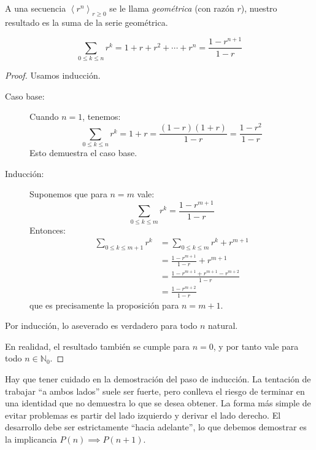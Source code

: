  A una secuencia \(\left\langle r^n \right\rangle_{r \ge 0}\)
  se le llama \emph{geométrica}
  (con razón \(r\)),
  nuestro resultado es la suma de la serie geométrica.
  \begin{theorem}
    \label{theo:suma-geometrica}
    \begin{equation*}
      \sum_{0 \le k \le n} r^k
	= 1 + r + r^2 + \dotsb + r^n
	= \frac{1 - r^{n + 1}}{1 - r}
    \end{equation*}
  \end{theorem}
  \begin{proof}
    Usamos inducción.
    \begin{description}
    \item[Caso base:]
      Cuando \(n = 1\),
      tenemos:
      \begin{equation*}
	\sum_{0 \le k \le n} r^k
	= 1 + r
	= \frac{(1 - r) (1 + r)}{1 - r}
	= \frac{1 - r^2}{1 - r}
      \end{equation*}
      Esto demuestra el caso base.
    \item[Inducción:]
      Suponemos que para \(n = m\) vale:
      \begin{equation*}
	\sum_{0 \le k \le m} r^k
	  = \frac{1 - r^{m + 1}}{1 - r}
      \end{equation*}
      Entonces:
      \begin{align*}
	\sum_{0 \le k \le m + 1} r^k
	  &= \sum_{0 \le k \le m} r^k + r^{m + 1} \\
	  &= \frac{1 - r^{m + 1}}{1 - r} + r^{m + 1} \\
	  &= \frac{1 - r^{m + 1} + r^{m + 1} - r^{m + 2}}{1 - r} \\
	  &= \frac{1 - r^{m + 2}}{1 - r}
      \end{align*}
      que es precisamente la proposición para \(n = m + 1\).
    \end{description}
    Por inducción,
    lo aseverado es verdadero para todo \(n\) natural.

    En realidad,
    el resultado también se cumple para \(n = 0\),
    y por tanto vale para todo \(n \in \mathbb{N}_0\).
  \end{proof}

  Hay que tener cuidado en la demostración del paso de inducción.
  La tentación de trabajar ``a ambos lados'' suele ser fuerte,
  pero conlleva el riesgo de terminar en una identidad
  que no demuestra lo que se desea obtener.
  La forma más simple de evitar problemas
  es partir del lado izquierdo y derivar el lado derecho.
  El desarrollo debe ser estrictamente ``hacia adelante'',
  lo que debemos demostrar
  es la implicancia \(P(n) \implies P(n + 1)\).

